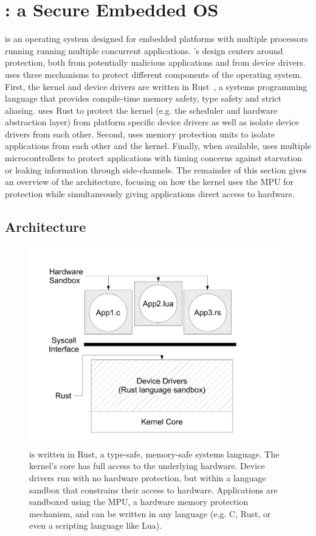 \section{\name: a Secure Embedded OS}
\label{sec:os}

\name is an operating system  designed for embedded platforms
with multiple processors running running multiple concurrent applications.
\name's design centers around protection, both from potentially
malicious applications and from device drivers. \name uses three
mechanisms to protect different components of the operating
system. First, the kernel and device drivers are written in Rust~\cite{rust}, 
a systems programming language that provides compile-time memory safety, 
type safety and
strict aliasing. \name uses Rust to protect the kernel (e.g. the
scheduler and hardware abstraction layer) from platform specific
device drivers as well as isolate device drivers from each other. 
Second, \name uses memory protection units
 to isolate applications from each other and
the kernel. Finally, when available, \name uses multiple microcontrollers to
protect applications with timing concerns against starvation or leaking
information through side-channels. The remainder of this section gives an
overview of the \name architecture, focusing on how the kernel uses the
MPU for protection while simultaneously giving applications direct access
to hardware.

\subsection{Architecture}
\label{sec:os-arch}

\begin{figure}
 \centering
\includegraphics[width=1\columnwidth]{img/architecture}
\caption{\name is written in Rust, a type-safe, memory-safe systems language.
The \name kernel's core has full access to the underlying hardware. Device
drivers run with no hardware protection, but within a language sandbox that
constrains their access to hardware. Applications are sandboxed using the MPU, a
hardware memory protection mechanism, and can be written in any language (e.g.
C, Rust, or even a scripting language like Lua).}
\label{fig:architecture}
\end{figure}

